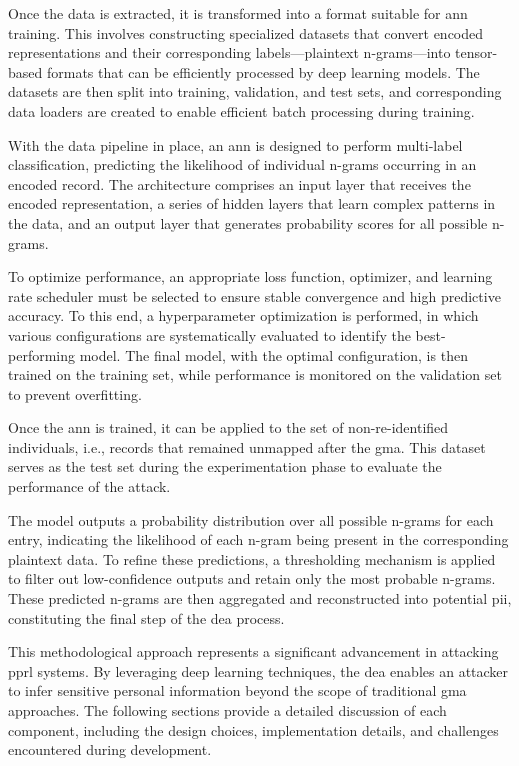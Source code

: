 Once the data is extracted, it is transformed into a format suitable for \ac{ann} training.
This involves constructing specialized datasets that convert encoded representations and their corresponding labels—plaintext n-grams—into tensor-based formats that can be efficiently processed by deep learning models.
The datasets are then split into training, validation, and test sets, and corresponding data loaders are created to enable efficient batch processing during training.

With the data pipeline in place, an \ac{ann} is designed to perform multi-label classification, predicting the likelihood of individual n-grams occurring in an encoded record.
The architecture comprises an input layer that receives the encoded representation, a series of hidden layers that learn complex patterns in the data, and an output layer that generates probability scores for all possible n-grams.

To optimize performance, an appropriate loss function, optimizer, and learning rate scheduler must be selected to ensure stable convergence and high predictive accuracy.
To this end, a hyperparameter optimization is performed, in which various configurations are systematically evaluated to identify the best-performing model.
The final model, with the optimal configuration, is then trained on the training set, while performance is monitored on the validation set to prevent overfitting.

Once the \ac{ann} is trained, it can be applied to the set of non-re-identified individuals, i.e., records that remained unmapped after the \ac{gma}.
This dataset serves as the test set during the experimentation phase to evaluate the performance of the attack.

The model outputs a probability distribution over all possible n-grams for each entry, indicating the likelihood of each n-gram being present in the corresponding plaintext data.
To refine these predictions, a thresholding mechanism is applied to filter out low-confidence outputs and retain only the most probable n-grams.
These predicted n-grams are then aggregated and reconstructed into potential \ac{pii}, constituting the final step of the \ac{dea} process.

This methodological approach represents a significant advancement in attacking \ac{pprl} systems.
By leveraging deep learning techniques, the \ac{dea} enables an attacker to infer sensitive personal information beyond the scope of traditional \ac{gma} approaches.
The following sections provide a detailed discussion of each component, including the design choices, implementation details, and challenges encountered during development.

